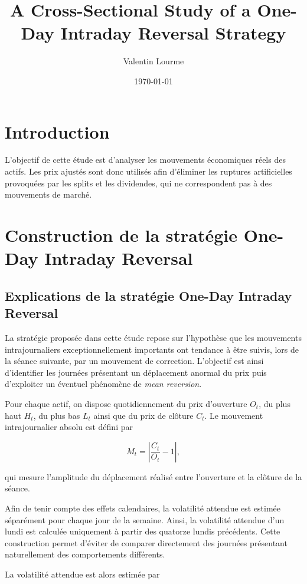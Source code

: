 \documentclass[11pt]{report}
\title{A Cross-Sectional Study of a One-Day Intraday Reversal Strategy}
\author{Valentin Lourme}
\date{\today}
\begin{document}
\maketitle
\tableofcontents

\chapter{Introduction}

L'objectif de cette étude est d'analyser les mouvements économiques réels des actifs. Les prix ajustés sont donc utilisés afin d'éliminer les ruptures artificielles provoquées par les splits et les dividendes, qui ne correspondent pas à des mouvements de marché.

\chapter{Construction de la stratégie One-Day Intraday Reversal}

\section{Explications de la stratégie One-Day Intraday Reversal}

La stratégie proposée dans cette étude repose sur l'hypothèse que les mouvements intrajournaliers exceptionnellement importants ont tendance à être suivis, lors de la séance suivante, par un mouvement de correction. L'objectif est ainsi d'identifier les journées présentant un déplacement anormal du prix puis d'exploiter un éventuel phénomène de \textit{mean reversion}.

Pour chaque actif, on dispose quotidiennement du prix d'ouverture $O_t$, du plus haut $H_t$, du plus bas $L_t$ ainsi que du prix de clôture $C_t$. Le mouvement intrajournalier absolu est défini par

$$
M_t=
\left|
\frac{C_t}{O_t}-1
\right|,
$$

qui mesure l'amplitude du déplacement réalisé entre l'ouverture et la clôture de la séance.

Afin de tenir compte des effets calendaires, la volatilité attendue est estimée séparément pour chaque jour de la semaine. Ainsi, la volatilité attendue d'un lundi est calculée uniquement à partir des quatorze lundis précédents. Cette construction permet d'éviter de comparer directement des journées présentant naturellement des comportements différents.

La volatilité attendue est alors estimée par
\end{document}
